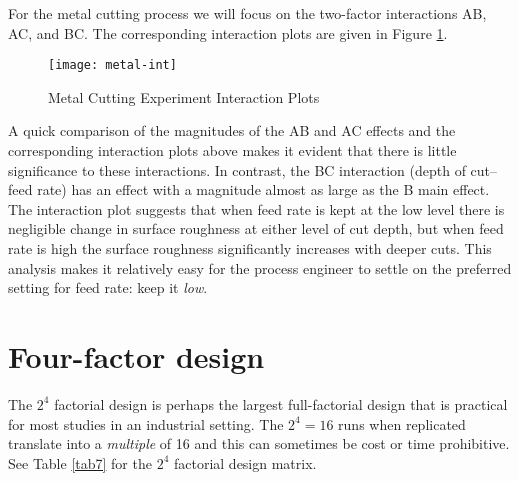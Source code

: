 For the metal cutting process we will focus on the two-factor interactions AB, AC, and BC.  The corresponding interaction plots are given in Figure \ref{fig7}.
\begin{figure}[h]\caption{Metal Cutting Experiment Interaction Plots}\label{fig7}
\begin{center}
\texttt{[image: metal-int]}
\end{center}
\end{figure}
A quick comparison of the magnitudes of the AB and AC effects and the corresponding interaction plots above makes it evident that there is little significance to these interactions. In contrast, the BC interaction (depth of cut--feed rate) has an effect with a magnitude almost as large as the B main effect.  The interaction plot suggests that when feed rate is kept at the low level there is negligible change in surface roughness at either level of cut depth, but when feed rate is high the surface roughness significantly increases with deeper cuts.  This analysis makes it relatively easy for the process engineer to settle on the preferred setting for feed rate:  keep it \textit{low}.

\section{Four-factor design}\label{4fac}
The $2^{4}$ factorial design is perhaps the largest full-factorial design that is practical for most studies in an industrial setting.  The $ 2^{4} = 16 $ runs when replicated translate into a \textit{multiple} of 16 and this can sometimes be cost or time prohibitive.  See Table \ref{tab7} for the $2^{4}$ factorial design matrix.

